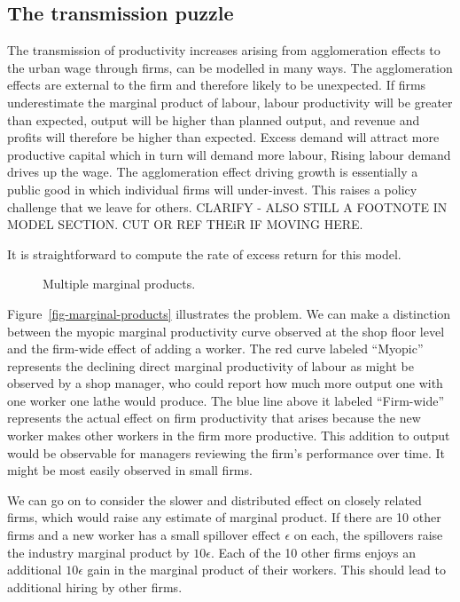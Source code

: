 \subsection{The transmission puzzle}

The transmission of productivity increases arising from agglomeration effects  to the urban wage through firms, can be modelled in many ways. The agglomeration effects are external to the firm and therefore likely to be unexpected. If  firms underestimate the marginal product of labour, labour productivity will be greater than expected, output will be higher than planned output, and revenue and profits will therefore be higher than expected. Excess demand will attract more productive capital which in turn will demand more labour,  Rising labour demand drives up the wage. The agglomeration effect driving growth is essentially a public good in which individual firms will under-invest. This raises a policy challenge that we leave for others. CLARIFY - ALSO STILL A FOOTNOTE IN MODEL SECTION. CUT OR REF THEiR IF MOVING HERE.

 It is straightforward to compute the rate of excess return for  this model. 


\begin{figure}
\centering

\caption{Multiple marginal products.}
\label{fig-multiple-marginal-products}
\end{figure}



Figure~\ref{fig-marginal-products} illustrates the problem. We can  make a distinction between the myopic marginal productivity curve observed  at the shop floor level and  the firm-wide effect of adding a worker. The red curve labeled ``Myopic'' represents the declining direct marginal productivity of labour as  might be observed by a shop manager, who could report how much more output one with one worker one lathe would produce. The blue line above it labeled ``Firm-wide'' represents the actual effect on firm productivity that arises because the new worker makes other workers in the firm more productive. This addition to output would be observable for managers reviewing the firm's performance over time. It might be most easily observed in small firms. 

We can go on to consider the slower and distributed effect on closely related firms, which would raise any estimate of marginal product.  If there are 10 other firms and a new worker  has a small spillover effect  $\epsilon$ on each,  the spillovers raise the industry  marginal product  by $10\epsilon$. Each of the  10 other firms  enjoys  an additional $10\epsilon$ gain in the marginal product of their workers. This should lead to additional hiring by other firms.

